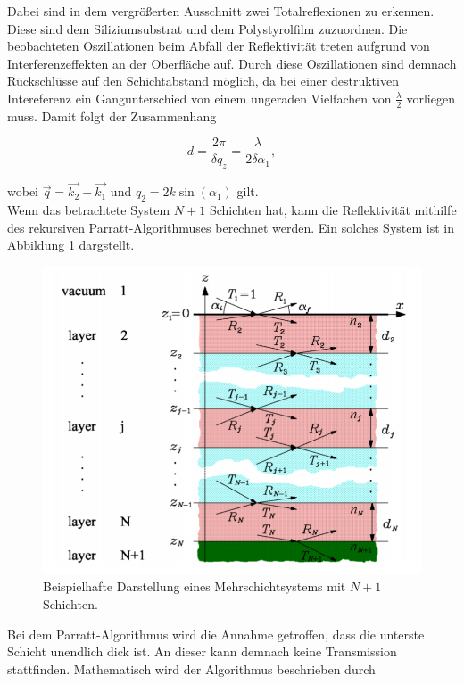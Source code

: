 Dabei sind in dem vergrößerten Ausschnitt zwei Totalreflexionen zu erkennen. Diese sind dem Siliziumsubstrat und dem Polystyrolfilm
zuzuordnen. Die beobachteten Oszillationen beim Abfall der Reflektivität treten aufgrund von Interferenzeffekten an der Oberfläche 
auf. Durch diese Oszillationen sind demnach Rückschlüsse auf den Schichtabstand möglich, da bei einer destruktiven Intereferenz 
ein Gangunterschied von einem ungeraden Vielfachen von $\frac{\lambda}{2}$ vorliegen muss. Damit folgt der Zusammenhang

\begin{equation*}
    d = \frac{2\pi}{\delta q_z} = \frac{\lambda}{2\delta\alpha_1},
\end{equation*}

wobei $\vec{q} = \vec{k_2}-\vec{k_1}$ und $q_2 = 2k\sin{\left(\alpha_1\right)}$ gilt.\\

Wenn das betrachtete System $N+1$ Schichten hat, kann die Reflektivität mithilfe des rekursiven Parratt-Algorithmuses 
berechnet werden. Ein solches System ist in Abbildung \ref{fig:ns} dargstellt. 

\begin{figure}
    \centering
    \includegraphics[scale=0.3]{content/nschichten.png}
    \caption{Beispielhafte Darstellung eines Mehrschichtsystems mit $N+1$ Schichten.\cite{Anleitungalt}}
    \label{fig:ns}
  \end{figure}

Bei dem Parratt-Algorithmus wird die Annahme getroffen, dass die unterste Schicht unendlich dick ist. An dieser
kann demnach keine Transmission stattfinden. Mathematisch wird der Algorithmus beschrieben durch 

